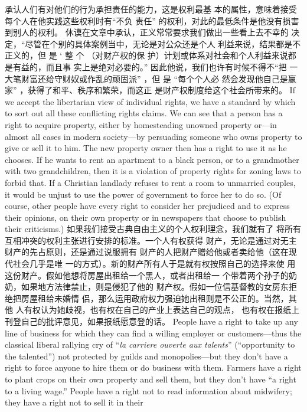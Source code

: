 \begin{paracol}{2}
承认人们有对他们的行为承担责任的能力，这是权利最基
本的属性，意味着接受每个人在他实践这些权利时有“不负
责任” 的权利，对此的最低条件是他没有损害到别人的权利。
休谟在文章中承认，正义常常要求我们做出一些看上去不幸的
决定，“尽管在个别的具体案例当中，无论是对公众还是个人
利益来说，结果都是不正义的，但 是 ‘ 整 个 （对财产权的保
护）计划或体系对社会和个人利益来说都是有益的，而且事
实上是绝对必要的。” 因此他说，我们也许有时候不得不“把
一大笔财富还给守财奴或作乱的顽固派” ，但 是 “每个个人必
然会发现他自己是赢家” ，获得了和平、秩序和繁荣，而这正
是财产权制度给这个社会所带来的。
\switchcolumn*
If we accept the libertarian view of individual rights, we have
a standard by which to sort out all these conflicting rights
claims. We can see that a person has a right to acquire property, either by homesteading unowned property or---in almost all
cases in modern society---by persuading someone who owns
property to give or sell it to him. The new property owner then
has a right to use it as he chooses. If he wants to rent an apartment to a black person, or to a grandmother with two grandchildren, then it is a violation of property rights for zoning laws
to forbid that. If a Christian landlady refuses to rent a room to
unmarried couples, it would be unjust to use the power of government to force her to do so. (Of course, other people have
every right to consider her prejudiced and to express their opinions, on their own property or in newspapers that choose to
publish their criticisms.)
\switchcolumn
如果我们接受古典自由主义的个人权利理念，我们就有了
将所有互相冲突的权利主张进行安排的标准。一个人有权获得
财产，无论是通过对无主财产的先占原则，还是通过说服拥有
财产的人把财产赠给他或者卖给他（这在现代社会几乎是唯
一的方式）。新的财产所有人于是就有权按照自己的选择来使
用这份财产。假如他想将房屋出租给一个黑人，或者出租给一
个带着两个孙子的奶奶，如果地方法律禁止，则是侵犯了他的
财产权。假如一位信基督教的女房东拒绝把房屋租给未婚情
侣，那么运用政府权力强迫她出租则是不公正的。当然，其他
人有权认为她歧视，也有权在自己的产业上表达自己的观点，
也有权在报纸上刊登自己的批评意见，如果报纸愿意登的话。
\switchcolumn*
People have a right to take up any line of business for which
they can find a willing employer or customers---thus the classical liberal rallying cry of ``\textit{la carriere ouverte aux talents}'' (``opportunity to the talented'') not protected by guilds and
monopolies---but they don't have a right to force anyone to hire
them or do business with them. Farmers have a right to plant
crops on their own property and sell them, but they don't have
``a right to a living wage.'' People have a right not to read information about midwifery; they have a right not to sell it in their

\end{paracol}
